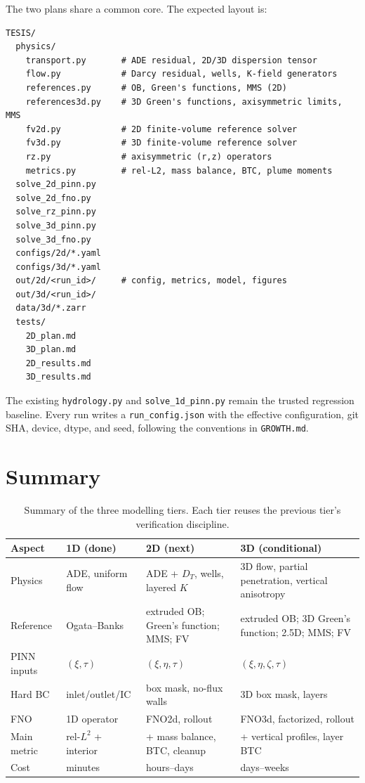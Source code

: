 \documentclass[11pt]{article}
\newcommand{\tabhead}[1]{\textbf{#1}}
\begin{document}
The two plans share a common core.  The expected layout is:
\begin{verbatim}
TESIS/
  physics/
    transport.py       # ADE residual, 2D/3D dispersion tensor
    flow.py            # Darcy residual, wells, K-field generators
    references.py      # OB, Green's functions, MMS (2D)
    references3d.py    # 3D Green's functions, axisymmetric limits, MMS
    fv2d.py            # 2D finite-volume reference solver
    fv3d.py            # 3D finite-volume reference solver
    rz.py              # axisymmetric (r,z) operators
    metrics.py         # rel-L2, mass balance, BTC, plume moments
  solve_2d_pinn.py
  solve_2d_fno.py
  solve_rz_pinn.py
  solve_3d_pinn.py
  solve_3d_fno.py
  configs/2d/*.yaml
  configs/3d/*.yaml
  out/2d/<run_id>/     # config, metrics, model, figures
  out/3d/<run_id>/
  data/3d/*.zarr
  tests/
    2D_plan.md
    3D_plan.md
    2D_results.md
    3D_results.md
\end{verbatim}
The existing \texttt{hydrology.py} and \texttt{solve\_1d\_pinn.py} remain the
trusted regression baseline.  Every run writes a \texttt{run\_config.json}
with the effective configuration, git SHA, device, dtype, and seed, following
the conventions in \texttt{GROWTH.md}.

\section{Summary}
\label{sec:summary}

\begin{table}[htbp]
\centering
\small
\begin{tabularx}{\textwidth}{@{}lYYY@{}}
\toprule
\tabhead{Aspect} & \tabhead{1D (done)} & \tabhead{2D (next)} & \tabhead{3D (conditional)}\\
\midrule
Physics & ADE, uniform flow & ADE + $D_T$, wells, layered $K$ &
3D flow, partial penetration, vertical anisotropy\\
Reference & Ogata--Banks & extruded OB; Green's function; MMS; FV &
extruded OB; 3D Green's function; 2.5D; MMS; FV\\
PINN inputs & $(\xi,\tau)$ & $(\xi,\eta,\tau)$ & $(\xi,\eta,\zeta,\tau)$\\
Hard BC & inlet/outlet/IC & box mask, no-flux walls & 3D box mask, layers\\
FNO & 1D operator & FNO2d, rollout & FNO3d, factorized, rollout\\
Main metric & rel-$L^2$ + interior & + mass balance, BTC, cleanup &
+ vertical profiles, layer BTC\\
Cost & minutes & hours--days & days--weeks\\
\bottomrule
\end{tabularx}
\caption{Summary of the three modelling tiers.  Each tier reuses the previous
tier's verification discipline.}
\label{tab:summary}
\end{table}
\end{document}
